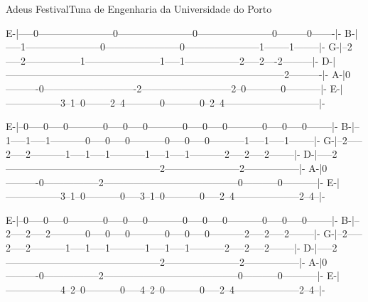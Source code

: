 \begin{musica}{Adeus Festival}{Tuna de Engenharia da Universidade do Porto}{}
\begin{tablatura}
E-|-----0-----------------------0-----------------------0-----------------------0---------0-------|-
B-|-----1-----------------------0-----------------------0-----------------------1--------1--------|-
G-|--2-----2-----------------1-----------------------1-----1-----------------2-----2----2---------|-
D-|------------------------------------------------------------------------------------2----------|-
A-|0----------0----------------------------2---------------------------2--0-----------0-----------|-
E-|-----------------3--1--0--------2--4-----------0-----------0--2--4-----------------------------|-
\end{tablatura}

\begin{tablatura}
E-|--0-----0-----0-----------0-----0-----0-----------0-----0-----0-----------0-----0-----0--------|-
B-|--1-----1-----1-----------0-----0-----0-----------0-----0-----0-----------1-----1-----1--------|-
G-|--2-----2-----2-----------1-----1-----1-----------1-----1-----1-----------2-----2-----2--------|-  
D-|-----2-----------------------------------------------2-----------------------2-----------------|-
A-|0----------0-----------------2-----------------------------------------0-----------0-----------|-
E-|-----------------3--1--0-----------0-----3--1--0-----------0-----2--4--------------------2--4--|-
\end{tablatura}

\begin{tablatura}
E-|--0-----0-----0-----------0-----0-----0-----------0-----0-----0-----------0-----0-----0--------|-
B-|--2-----2-----2-----------0-----0-----0-----------0-----0-----0-----------2-----2-----2--------|-
G-|--2-----2-----2-----------1-----1-----1-----------1-----1-----1-----------2-----2-----2--------|-  
D-|-----2-----------------------------------------------2-----------------------2-----------------|-
A-|0----------0-----------------2-----------------------------------------0-----------0-----------|-
E-|-----------------4--2--0-----------0-----4--2--0-----------0-----2--4--------------------2--4--|-
\end{tablatura}


\end{musica}
